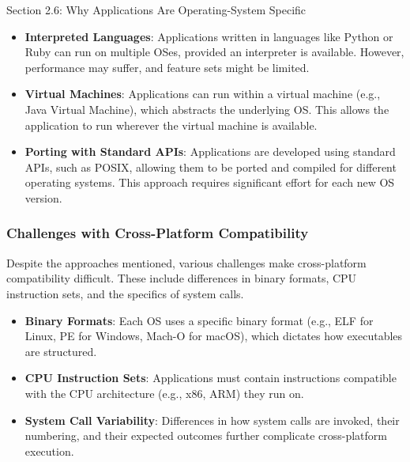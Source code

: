 \begin{notes}{Section 2.6: Why Applications Are Operating-System Specific}
    \begin{highlight}
    
    \begin{itemize}
        \item \textbf{Interpreted Languages}: Applications written in languages like Python or Ruby can run on multiple OSes, provided an interpreter is available. However, performance may suffer, and 
        feature sets might be limited.
        \item \textbf{Virtual Machines}: Applications can run within a virtual machine (e.g., Java Virtual Machine), which abstracts the underlying OS. This allows the application to run wherever the 
        virtual machine is available.
        \item \textbf{Porting with Standard APIs}: Applications are developed using standard APIs, such as POSIX, allowing them to be ported and compiled for different operating systems. This approach 
        requires significant effort for each new OS version.
    \end{itemize}
    
    \end{highlight}
    
    \subsubsection*{Challenges with Cross-Platform Compatibility}
    
    Despite the approaches mentioned, various challenges make cross-platform compatibility difficult. These include differences in binary formats, CPU instruction sets, and the specifics of system calls.
    
    \begin{highlight}
    
    \begin{itemize}
        \item \textbf{Binary Formats}: Each OS uses a specific binary format (e.g., ELF for Linux, PE for Windows, Mach-O for macOS), which dictates how executables are structured.
        \item \textbf{CPU Instruction Sets}: Applications must contain instructions compatible with the CPU architecture (e.g., x86, ARM) they run on.
        \item \textbf{System Call Variability}: Differences in how system calls are invoked, their numbering, and their expected outcomes further complicate cross-platform execution.
    \end{itemize}
    

\end{highlight}
\end{notes}
